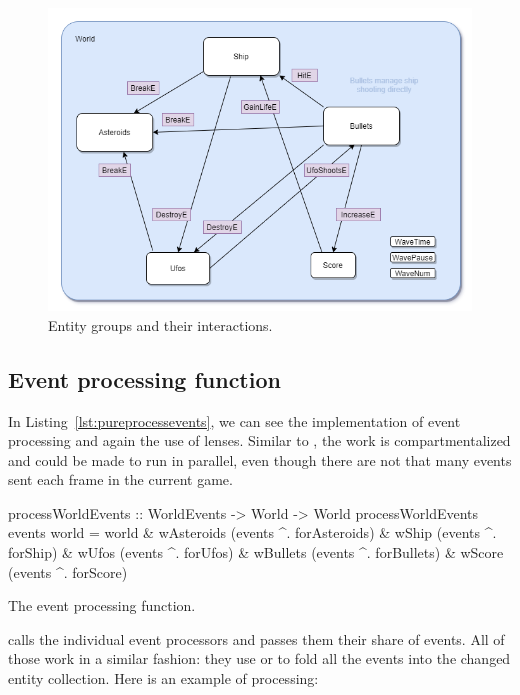 \documentclass[
  digital, %
  color,   %
  table,   %
  oneside, %
  lof,     %
  lot,     %
]{fithesis3}
\begin{document}
{%
\begin{figure}
    \centering
    \includegraphics[width=0.9 \textwidth]{images/entity-relationships-transparent-bg.png}
    \caption{Entity groups and their interactions.}
    \label{fig:entitygroups}
\end{figure}



\subsection{Event processing function}

In Listing~\ref{lst:pureprocessevents}, we can see the implementation of
event processing and again the use of lenses.
Similar to , the work is compartmentalized
and could be made to run in parallel, even though there are not that many
events sent each frame in the current game.
\begin{listing}
\begin{haskell}
processWorldEvents :: WorldEvents -> World -> World
processWorldEvents events world =
    world
      & wAsteroids %
                        (events ^. forAsteroids)
      & wShip      %
                        (events ^. forShip)
      & wUfos      %
                        (events ^. forUfos)
      & wBullets   %
                        (events ^. forBullets)
      & wScore     %
                        (events ^. forScore)
\end{haskell}
\caption{The event processing function.}
\label{lst:pureprocessevents}
\end{listing}
 calls the individual event processors and passes them
their share of events. All of those work in a similar fashion: they use 
or  to fold all the events into the changed entity collection.
Here is an example of  processing:

}
\end{document}
